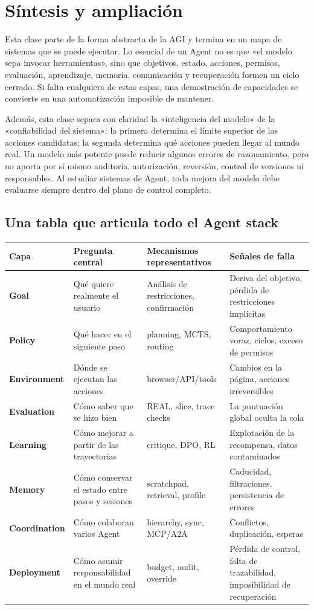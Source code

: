 \section{Síntesis y ampliación}

Esta clase parte de la forma abstracta de la AGI y termina en un mapa de sistemas que se puede ejecutar. Lo esencial de un Agent no es que «el modelo sepa invocar herramientas», sino que objetivos, estado, acciones, permisos, evaluación, aprendizaje, memoria, comunicación y recuperación formen un ciclo cerrado. Si falta cualquiera de estas capas, una demostración de capacidades se convierte en una automatización imposible de mantener.

Además, esta clase separa con claridad la «inteligencia del modelo» de la «confiabilidad del sistema»: la primera determina el límite superior de las acciones candidatas; la segunda determina qué acciones pueden llegar al mundo real. Un modelo más potente puede reducir algunos errores de razonamiento, pero no aporta por sí mismo auditoría, autorización, reversión, control de versiones ni responsables. Al estudiar sistemas de Agent, toda mejora del modelo debe evaluarse siempre dentro del plano de control completo.

\subsection{Una tabla que articula todo el Agent stack}

\begin{center}
\begin{tabularx}{\textwidth}{>{\bfseries}p{} X X X}
Capa & Pregunta central & Mecanismos representativos & Señales de falla \\
\hline
Goal & Qué quiere realmente el usuario & Análisis de restricciones, confirmación & Deriva del objetivo, pérdida de restricciones implícitas \\
Policy & Qué hacer en el siguiente paso & planning, MCTS, routing & Comportamiento voraz, ciclos, exceso de permisos \\
Environment & Dónde se ejecutan las acciones & browser/API/tools & Cambios en la página, acciones irreversibles \\
Evaluation & Cómo saber que se hizo bien & REAL, slice, trace checks & La puntuación global oculta la cola \\
Learning & Cómo mejorar a partir de las trayectorias & critique, DPO, RL & Explotación de la recompensa, datos contaminados \\
Memory & Cómo conservar el estado entre pasos y sesiones & scratchpad, retrieval, profile & Caducidad, filtraciones, persistencia de errores \\
Coordination & Cómo colaboran varios Agent & hierarchy, sync, MCP/A2A & Conflictos, duplicación, esperas \\
Deployment & Cómo asumir responsabilidad en el mundo real & budget, audit, override & Pérdida de control, falta de trazabilidad, imposibilidad de recuperación \\
\end{tabularx}
\end{center}

